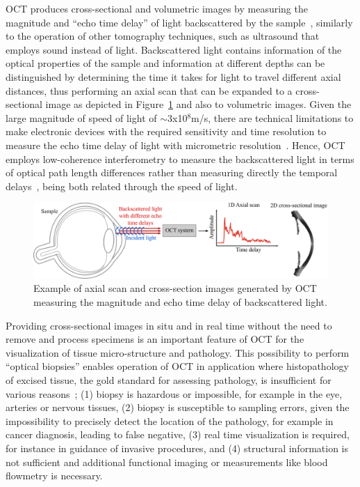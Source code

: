 OCT produces cross-sectional and volumetric images by measuring the magnitude and ``echo time delay'' of light backscattered by the sample~\cite{}, similarly to the operation of other tomography techniques, such as ultrasound that employs sound instead of light. Backscattered light contains information of the optical properties of the sample and information at different depths can be distinguished by determining the time it takes for light to travel different axial distances, thus performing an axial scan that can be expanded to a cross-sectional image as depicted in Figure~\ref{fig:BasicOCT} and also to volumetric images. Given the large magnitude of speed of light of $\sim$3x10$^8$m/s, there are technical limitations to make electronic devices with the required sensitivity and time resolution to measure the echo time delay of light with micrometric resolution~\cite{}. Hence, OCT employs low-coherence interferometry to measure the backscattered light in terms of optical path length differences rather than measuring directly the temporal delays~\cite{}, being both related through the speed of light.

\begin{figure}
    \centering
    \includegraphics[width=\textwidth]{Figures/Introduction/BasicOCT.pdf}
    \caption{Example of axial scan and cross-section images generated by OCT measuring the magnitude and echo time delay of backscattered light.}
    \label{fig:BasicOCT}
\end{figure}

Providing cross-sectional images in situ and in real time without the need to remove and process specimens is an important feature of OCT for the visualization of tissue micro-structure and pathology. This possibility to perform ``optical biopsies'' enables operation of OCT in application where histopathology of excised tissue, the gold standard for assessing pathology, is insufficient for various reasons~\cite{}; (1) biopsy is hazardous or impossible, for example in the eye, arteries or nervous tissues, (2) biopsy is susceptible to sampling errors, given the impossibility to precisely detect the location of the pathology, for example in cancer diagnosis, leading to false negative, (3) real time visualization is required, for instance in guidance of invasive procedures, and (4) structural information is not sufficient and additional functional imaging or measurements like blood flowmetry is necessary.

